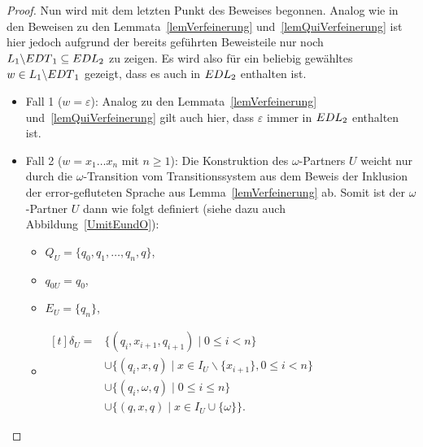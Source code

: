 \begin{proof}
  Nun wird mit dem letzten Punkt des Beweises begonnen. Analog
  wie in den Beweisen zu den Lemmata~\ref{lemVerfeinerung} und~\ref{lemQuiVerfeinerung} ist
  hier jedoch aufgrund der bereits geführten Beweisteile nur noch
  $L_1\backslash EDT{}_1\subseteq EDL{}_2$ zu zeigen. Es wird also für ein
  beliebig gewähltes $w\in L_1\backslash EDT{}_1$ gezeigt, dass es auch in
  $EDL{}_2$ enthalten ist.
  \begin{itemize}
    \item Fall 1 ($w=\varepsilon$): Analog zu den Lemmata~\ref{lemVerfeinerung}
      und~\ref{lemQuiVerfeinerung} gilt auch hier, dass $\varepsilon$ immer in
      $EDL{}_2$ enthalten ist.
    \item Fall 2 ($w=x_1\dots x_n$ mit $n\geq 1$): Die Konstruktion des
      $\omega$-Partners $U$ weicht nur durch die $\omega$-Transition vom
      Transitionssystem aus dem Beweis der Inklusion der error-gefluteten Sprache \EL{} aus
      Lemma~\ref{lemVerfeinerung} ab. Somit ist der $\omega$-Partner $U$ dann
      wie folgt definiert (siehe dazu auch Abbildung~\ref{UmitEundO}):
      \begin{itemize}
        \item $Q_U=\{q_0,q_1,\dots ,q_n,q\}$,
        \item $q_{0U}=q_0$,
        \item $E_U=\{q_n\}$,
        \item $\begin{aligned}[t]
            \delta _U=&\{(q_i,x_{i+1},q_{i+1})\mid 0\leq i< n\}\\
                      &\cup\{(q_i,x,q)\mid x\in I_U\backslash\{x_{i+1}\},0\leq
          i < n\}\\
          &\cup\{(q_i,\omega ,q)\mid 0\leq i\leq n\}\\
          &\cup\{(q,x ,q)\mid x\in I_U\cup \{\omega\}\}.
              \end{aligned}$
      \end{itemize}
      \begin{figure} [h!tbp]
      \begin{center}
\end{center}
\end{figure}
\end{itemize}
\end{proof}
